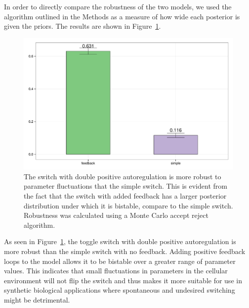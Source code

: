 In order to directly compare the robustness of the two models, we used the algorithm outlined in the Methods as a measure of how wide each posterior is given the priors. The results are shown in Figure~\ref{fig:robust_std_doubpos}. 

\begin{figure}[p]
\centering
\includegraphics[scale=0.5]{images/robustness_comparison.pdf}
\caption{The switch with double positive autoregulation is more robust to parameter fluctuations that the simple switch. This is evident from the fact that the switch with added feedback has a larger posterior distribution under which it is bistable, compare to the simple switch. Robustness was calculated using a Monte Carlo accept reject algorithm. }
\label{fig:robust_std_doubpos}
\end{figure}
As seen in Figure~\ref{fig:robust_std_doubpos}, the toggle switch with double positive autoregulation is more robust than the simple switch with no feedback. Adding positive feedback loops to the model allows it to be bistable over a greater range of parameter values. This indicates that small fluctuations in parameters in the cellular environment will not flip the switch and thus makes it more suitable for use in synthetic biological applications where spontaneous and undesired switching might be detrimental. 


